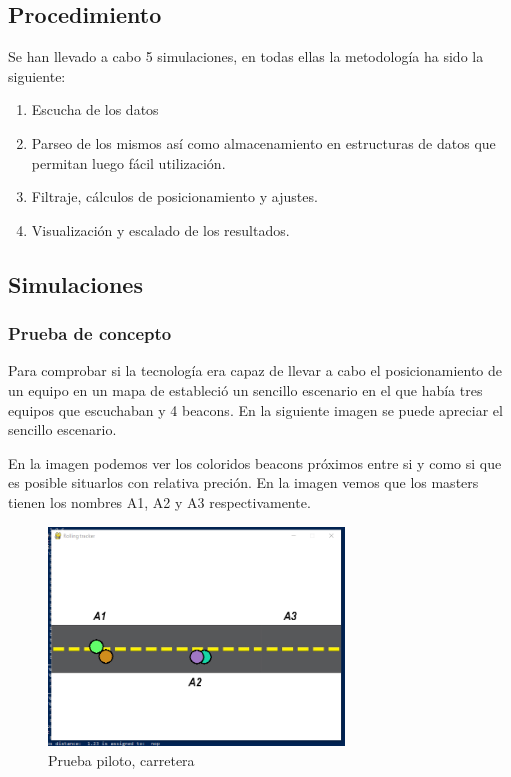 \documentclass[paper=a4, fontsize=11pt,twoside]{scrartcl}
\begin{document}
    \subsection{Procedimiento}
        Se han llevado a cabo 5 simulaciones, en todas ellas la metodología ha sido la siguiente:
        \begin{enumerate}
            \item Escucha de los datos
            \item Parseo de los mismos así como almacenamiento en estructuras de datos que permitan luego fácil utilización.
            \item Filtraje, cálculos de posicionamiento y ajustes.
            \item Visualización y escalado de los resultados.
        \end{enumerate}
    \subsection{Simulaciones}
        \subsubsection{Prueba de concepto}
            Para comprobar si la tecnología era capaz de llevar a cabo el posicionamiento de un equipo en un mapa de estableció un sencillo
            escenario en el que había tres equipos que escuchaban y 4 beacons. En la siguiente imagen se puede apreciar el sencillo escenario.

            En la imagen podemos ver los coloridos beacons próximos entre si y como si que es posible situarlos con relativa preción. En la imagen 
            vemos que los masters tienen los nombres A1, A2 y A3 respectivamente.
            \begin{center}
                \begin{figure}[]
                    \centering
                    \includegraphics[width=0.7\textwidth]{../../Memmory/images/road_1.PNG}
                    \caption{Prueba piloto, carretera}
                    \label{fig:mesh14}
                \end{figure}
            \end{center}
\end{document}
